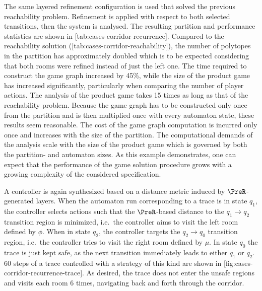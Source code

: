     The same layered refinement configuration is used that solved the previous reachability problem.
    Refinement is applied with respect to both selected transitions, then the system is analysed.
    The resulting partition and performance statistics are shown in [tab:cases-corridor-recurrence].
    Compared to the reachability solution ([tab:cases-corridor-reachability]), the number of polytopes in the partition has approximately doubled which is to be expected considering that both rooms were refined instead of just the left one.
    The time required to construct the game graph increased by 45\%, while the size of the product game has increased significantly, particularly when comparing the number of player actions.
    The analysis of the product game takes 15 times as long as that of the reachability problem.
    Because the game graph has to be constructed only once from the partition and is then multiplied once with every automaton state, these results seem reasonable.
    The cost of the game graph computation is incurred only once and increases with the size of the partition.
    The computational demands of the analysis scale with the size of the product game which is governed by both the partition- and automaton sizes.
    As this example demonstrates, one can expect that the performance of the game solution procedure grows with a growing complexity of the considered specification.
    
    A controller is again synthesized based on a distance metric induced by $\PreR$-generated layers.
    When the automaton run corresponding to a trace is in state $q_1$, the controller selects actions such that the $\PreR$-based distance to the $q_1 \rightarrow q_2$ transition region is minimized, i.e.\ the controller aims to visit the left room defined by $\phi$.
    When in state $q_2$, the controller targets the $q_2 \rightarrow q_0$ transition region, i.e.\ the controller tries to visit the right room defined by $\mu$.
    In state $q_0$ the trace is just kept safe, as the next transition immediately leads to either $q_1$ or $q_2$.
    60 steps of a trace controlled with a strategy of this kind are shown in [fig:cases-corridor-recurrence-trace].
    As desired, the trace does not enter the unsafe regions and visits each room 6 times, navigating back and forth through the corridor.


\stopsubsection

